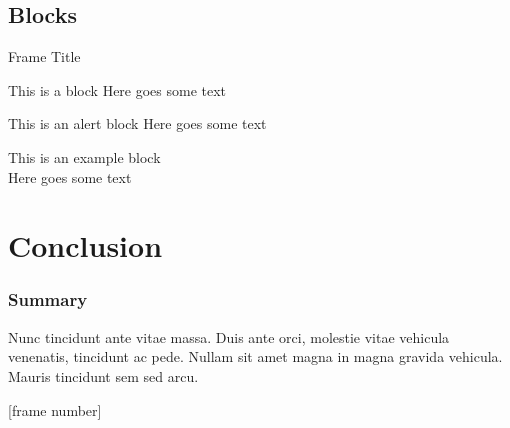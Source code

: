 \documentclass[
	11pt,
	aspectratio=169,
]{beamer}
\begin{document}

\subsection{Blocks}

\begin{frame}{Frame Title}
    \begin{block}{This is a block}
    Here goes some text
    \end{block}

    \begin{alertblock}{This is an alert block}
    Here goes some text
    \end{alertblock}

    \begin{examples}{This is an example block}
    \\Here goes some text
    \end{examples}
\end{frame}

\section{Conclusion}
\begin{frame}
	\frametitle{Summary}
	Nunc tincidunt ante vitae massa. Duis ante orci, molestie vitae vehicula venenatis, tincidunt ac pede. Nullam sit amet magna in magna gravida vehicula. Mauris tincidunt sem sed arcu.
\end{frame}


\begin{frame}
	\titlepage %
\end{frame}
[frame number]


\end{document}
